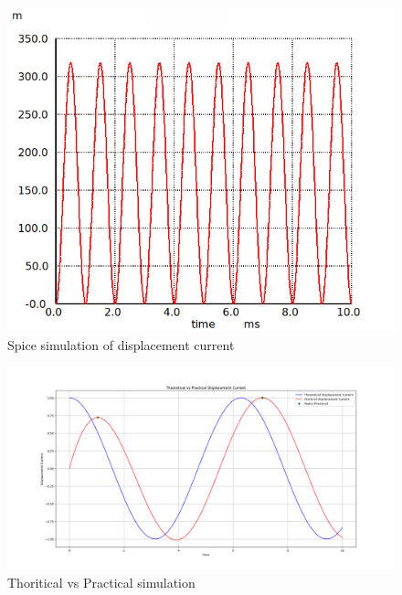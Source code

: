 \documentclass[journal,12pt,twocolumn]{IEEEtran}
\begin{document}
\begin{figure}[ht]
    \centering
    \includegraphics[width=\columnwidth]{figs/Figure_3.png}
    \caption{Spice simulation of displacement current}
    \label{fig:fig_gate_ec_2022_24_3}
\end{figure}


\begin{figure}[ht]
    \centering
    \includegraphics[width=\columnwidth]{figs/Figure_2.png}
    \caption{Thoritical vs Practical simulation}
    \label{fig:fig_gate_ec_2022_24_2}
\end{figure}
\end{document}
